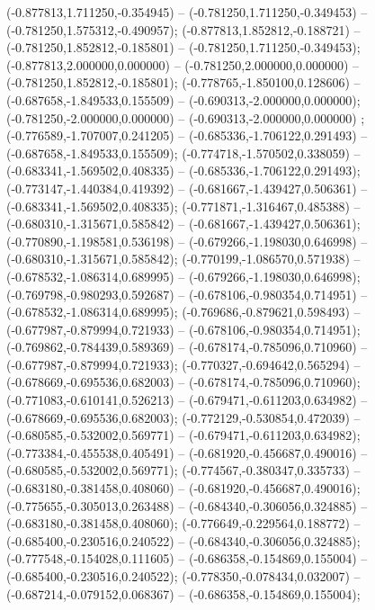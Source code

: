  (-0.877813,1.711250,-0.354945) -- (-0.781250,1.711250,-0.349453) -- (-0.781250,1.575312,-0.490957);
 (-0.877813,1.852812,-0.188721) -- (-0.781250,1.852812,-0.185801) -- (-0.781250,1.711250,-0.349453);
 (-0.877813,2.000000,0.000000) -- (-0.781250,2.000000,0.000000) -- (-0.781250,1.852812,-0.185801);
 (-0.778765,-1.850100,0.128606) -- (-0.687658,-1.849533,0.155509) -- (-0.690313,-2.000000,0.000000);
 (-0.781250,-2.000000,0.000000) -- (-0.690313,-2.000000,0.000000) ;
 (-0.776589,-1.707007,0.241205) -- (-0.685336,-1.706122,0.291493) -- (-0.687658,-1.849533,0.155509);
 (-0.774718,-1.570502,0.338059) -- (-0.683341,-1.569502,0.408335) -- (-0.685336,-1.706122,0.291493);
 (-0.773147,-1.440384,0.419392) -- (-0.681667,-1.439427,0.506361) -- (-0.683341,-1.569502,0.408335);
 (-0.771871,-1.316467,0.485388) -- (-0.680310,-1.315671,0.585842) -- (-0.681667,-1.439427,0.506361);
 (-0.770890,-1.198581,0.536198) -- (-0.679266,-1.198030,0.646998) -- (-0.680310,-1.315671,0.585842);
 (-0.770199,-1.086570,0.571938) -- (-0.678532,-1.086314,0.689995) -- (-0.679266,-1.198030,0.646998);
 (-0.769798,-0.980293,0.592687) -- (-0.678106,-0.980354,0.714951) -- (-0.678532,-1.086314,0.689995);
 (-0.769686,-0.879621,0.598493) -- (-0.677987,-0.879994,0.721933) -- (-0.678106,-0.980354,0.714951);
 (-0.769862,-0.784439,0.589369) -- (-0.678174,-0.785096,0.710960) -- (-0.677987,-0.879994,0.721933);
 (-0.770327,-0.694642,0.565294) -- (-0.678669,-0.695536,0.682003) -- (-0.678174,-0.785096,0.710960);
 (-0.771083,-0.610141,0.526213) -- (-0.679471,-0.611203,0.634982) -- (-0.678669,-0.695536,0.682003);
 (-0.772129,-0.530854,0.472039) -- (-0.680585,-0.532002,0.569771) -- (-0.679471,-0.611203,0.634982);
 (-0.773384,-0.455538,0.405491) -- (-0.681920,-0.456687,0.490016) -- (-0.680585,-0.532002,0.569771);
 (-0.774567,-0.380347,0.335733) -- (-0.683180,-0.381458,0.408060) -- (-0.681920,-0.456687,0.490016);
 (-0.775655,-0.305013,0.263488) -- (-0.684340,-0.306056,0.324885) -- (-0.683180,-0.381458,0.408060);
 (-0.776649,-0.229564,0.188772) -- (-0.685400,-0.230516,0.240522) -- (-0.684340,-0.306056,0.324885);
 (-0.777548,-0.154028,0.111605) -- (-0.686358,-0.154869,0.155004) -- (-0.685400,-0.230516,0.240522);
 (-0.778350,-0.078434,0.032007) -- (-0.687214,-0.079152,0.068367) -- (-0.686358,-0.154869,0.155004);
